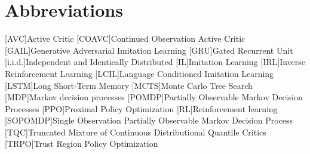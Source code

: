 
\chapter{Abbreviations}
\begin{acronym}
    [AVC]{Active Critic}
    [COAVC]{Continued Observation Active Critic}
    [GAIL]{Generative Adversarial Imitation Learning}
    [GRU]{Gated Recurrent Unit}
    [i.i.d.]{Independent and Identically Distributed}
    [IL]{Imitation Learning}
    [IRL]{Inverse Reinforcement Learning}
    [LCIL]{Language Conditioned Imitation Learning}
    [LSTM]{Long Short-Term Memory}
    [MCTS]{Monte Carlo Tree Search}
    [MDP]{Markov decision processes}
    [POMDP]{Partially Observable Markov Decision Processes}
    [PPO]{Proximal Policy Optimization}
    [RL]{Reinforcement learning}
    [SOPOMDP]{Single Observation Partially Observable Markov Decision Process}
    [TQC]{Truncated Mixture of Continuous Distributional Quantile Critics}
    [TRPO]{Trust Region Policy Optimization}
\end{acronym}
